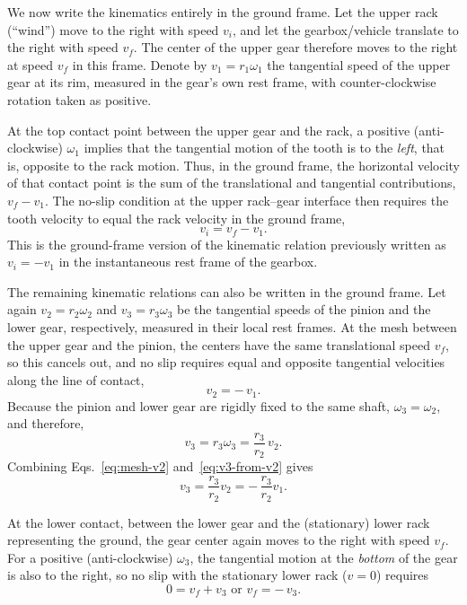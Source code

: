 \documentclass[reprint,aps,pra,longbibliography]{revtex4-2}
\begin{document}
We now write the kinematics entirely in the ground frame. Let the upper rack
(``wind'') move to the right with speed $v_i$, and let the gearbox/vehicle
translate to the right with speed $v_f$. The center of the upper gear therefore
moves to the right at speed $v_f$ in this frame. Denote by
$
v_1 = r_1 \omega_1
$
the tangential speed of the upper gear at its rim, measured in the gear's own
rest frame, with counter-clockwise rotation taken as positive.

At the top contact point between the upper gear and the rack, a positive
(anti-clockwise) $\omega_1$ implies that the tangential motion of the tooth is
to the \emph{left}, that is, opposite to the rack motion. Thus, in the ground
frame, the horizontal velocity of that contact point is the sum of the
translational and tangential contributions,
$v_f - v_1$.
The no-slip condition at the upper rack--gear interface then requires the tooth
velocity to equal the rack velocity in the ground frame,
\begin{equation}
v_i = v_f - v_1.
\label{eq:upper-noslip-ground}
\end{equation}
This is the ground-frame version of the kinematic relation previously written
as $v_i = -v_1$ in the instantaneous rest frame of the gearbox.


The remaining kinematic relations can also be written in the ground frame.
Let again  $
v_2 = r_2 \omega_2$ and $ v_3 = r_3 \omega_3
$
be the tangential speeds of the pinion and the lower gear, respectively,
measured in their local rest frames. At the mesh between the upper gear and the
pinion, the centers have the same translational speed $v_f$, so this cancels
out, and no slip requires equal and opposite tangential velocities along the
line of contact,
\begin{equation}
v_2 = -\,v_1.
\label{eq:mesh-v2}
\end{equation}
Because the pinion and lower gear are rigidly fixed to the same shaft,  $\omega_3 = \omega_2$, and  therefore,
\begin{equation}
v_3 = r_3 \omega_3 = \frac{r_3}{r_2}\,v_2.
\label{eq:v3-from-v2}
\end{equation}
Combining Eqs.~\eqref{eq:mesh-v2} and~\eqref{eq:v3-from-v2} gives
\begin{equation}
v_3 = \frac{r_3}{r_2} v_2
    = -\,\frac{r_3}{r_2} v_1.
\label{eq:v3-v1}
\end{equation}

At the lower contact, between the lower gear and the (stationary) lower rack
representing the ground, the gear center again moves to the right with speed
$v_f$. For a positive (anti-clockwise) $\omega_3$, the tangential motion at the
\emph{bottom} of the gear is also to the right, so no slip with the stationary lower rack ($v=0$) requires
\begin{equation}
0 = v_f + v_3
\text{ or }
v_f = -\,v_3.
\label{eq:lower-noslip-ground}
\end{equation}
\end{document}
